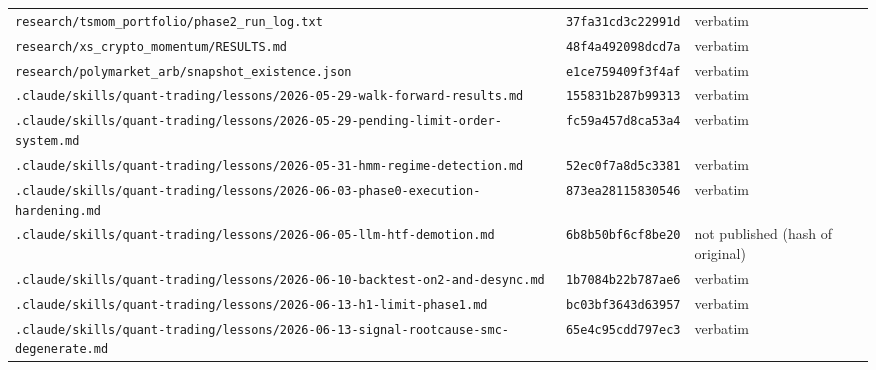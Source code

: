 {\begin{longtable}{@{}>{\raggedright\arraybackslash}p{8.6cm}p{2.7cm}>{\raggedright\arraybackslash}p{3.4cm}@{}}
\texttt{research/\allowbreak{}tsmom\_portfolio/\allowbreak{}phase2\_run\_log.txt} & \texttt{37fa31cd3c22991d} & verbatim \\
\texttt{research/\allowbreak{}xs\_crypto\_momentum/\allowbreak{}RESULTS.md} & \texttt{48f4a492098dcd7a} & verbatim \\
\texttt{research/\allowbreak{}polymarket\_arb/\allowbreak{}snapshot\_existence.json} & \texttt{e1ce759409f3f4af} & verbatim \\
\texttt{.claude/\allowbreak{}skills/\allowbreak{}quant-\allowbreak{}trading/\allowbreak{}lessons/\allowbreak{}2026-\allowbreak{}05-\allowbreak{}29-\allowbreak{}walk-\allowbreak{}forward-\allowbreak{}results.md} & \texttt{155831b287b99313} & verbatim \\
\texttt{.claude/\allowbreak{}skills/\allowbreak{}quant-\allowbreak{}trading/\allowbreak{}lessons/\allowbreak{}2026-\allowbreak{}05-\allowbreak{}29-\allowbreak{}pending-\allowbreak{}limit-\allowbreak{}order-\allowbreak{}system.md} & \texttt{fc59a457d8ca53a4} & verbatim \\
\texttt{.claude/\allowbreak{}skills/\allowbreak{}quant-\allowbreak{}trading/\allowbreak{}lessons/\allowbreak{}2026-\allowbreak{}05-\allowbreak{}31-\allowbreak{}hmm-\allowbreak{}regime-\allowbreak{}detection.md} & \texttt{52ec0f7a8d5c3381} & verbatim \\
\texttt{.claude/\allowbreak{}skills/\allowbreak{}quant-\allowbreak{}trading/\allowbreak{}lessons/\allowbreak{}2026-\allowbreak{}06-\allowbreak{}03-\allowbreak{}phase0-\allowbreak{}execution-\allowbreak{}hardening.md} & \texttt{873ea28115830546} & verbatim \\
\texttt{.claude/\allowbreak{}skills/\allowbreak{}quant-\allowbreak{}trading/\allowbreak{}lessons/\allowbreak{}2026-\allowbreak{}06-\allowbreak{}05-\allowbreak{}llm-\allowbreak{}htf-\allowbreak{}demotion.md} & \texttt{6b8b50bf6cf8be20} & not published (hash of original) \\
\texttt{.claude/\allowbreak{}skills/\allowbreak{}quant-\allowbreak{}trading/\allowbreak{}lessons/\allowbreak{}2026-\allowbreak{}06-\allowbreak{}10-\allowbreak{}backtest-\allowbreak{}on2-\allowbreak{}and-\allowbreak{}desync.md} & \texttt{1b7084b22b787ae6} & verbatim \\
\texttt{.claude/\allowbreak{}skills/\allowbreak{}quant-\allowbreak{}trading/\allowbreak{}lessons/\allowbreak{}2026-\allowbreak{}06-\allowbreak{}13-\allowbreak{}h1-\allowbreak{}limit-\allowbreak{}phase1.md} & \texttt{bc03bf3643d63957} & verbatim \\
\texttt{.claude/\allowbreak{}skills/\allowbreak{}quant-\allowbreak{}trading/\allowbreak{}lessons/\allowbreak{}2026-\allowbreak{}06-\allowbreak{}13-\allowbreak{}signal-\allowbreak{}rootcause-\allowbreak{}smc-\allowbreak{}degenerate.md} & \texttt{65e4c95cdd797ec3} & verbatim \\

\end{longtable}}

